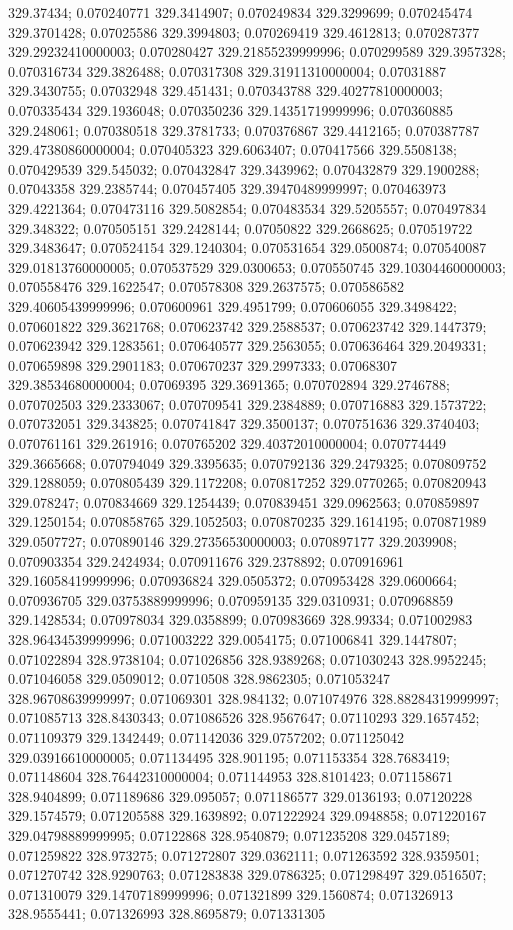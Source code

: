 329.37434; 0.070240771 329.3414907; 0.070249834 329.3299699; 0.070245474 329.3701428; 0.07025586 329.3994803; 0.070269419 329.4612813; 0.070287377 329.29232410000003; 0.070280427 329.21855239999996; 0.070299589 329.3957328; 0.070316734 329.3826488; 0.070317308 329.31911310000004; 0.07031887 329.3430755; 0.07032948 329.451431; 0.070343788 329.40277810000003; 0.070335434 329.1936048; 0.070350236 329.14351719999996; 0.070360885 329.248061; 0.070380518 329.3781733; 0.070376867 329.4412165; 0.070387787 329.47380860000004; 0.070405323 329.6063407; 0.070417566 329.5508138; 0.070429539 329.545032; 0.070432847 329.3439962; 0.070432879 329.1900288; 0.07043358 329.2385744; 0.070457405 329.39470489999997; 0.070463973 329.4221364; 0.070473116 329.5082854; 0.070483534 329.5205557; 0.070497834 329.348322; 0.070505151 329.2428144; 0.07050822 329.2668625; 0.070519722 329.3483647; 0.070524154 329.1240304; 0.070531654 329.0500874; 0.070540087 329.01813760000005; 0.070537529 329.0300653; 0.070550745 329.10304460000003; 0.070558476 329.1622547; 0.070578308 329.2637575; 0.070586582 329.40605439999996; 0.070600961 329.4951799; 0.070606055 329.3498422; 0.070601822 329.3621768; 0.070623742 329.2588537; 0.070623742 329.1447379; 0.070623942 329.1283561; 0.070640577 329.2563055; 0.070636464 329.2049331; 0.070659898 329.2901183; 0.070670237 329.2997333; 0.07068307 329.38534680000004; 0.07069395 329.3691365; 0.070702894 329.2746788; 0.070702503 329.2333067; 0.070709541 329.2384889; 0.070716883 329.1573722; 0.070732051 329.343825; 0.070741847 329.3500137; 0.070751636 329.3740403; 0.070761161 329.261916; 0.070765202 329.40372010000004; 0.070774449 329.3665668; 0.070794049 329.3395635; 0.070792136 329.2479325; 0.070809752 329.1288059; 0.070805439 329.1172208; 0.070817252 329.0770265; 0.070820943 329.078247; 0.070834669 329.1254439; 0.070839451 329.0962563; 0.070859897 329.1250154; 0.070858765 329.1052503; 0.070870235 329.1614195; 0.070871989 329.0507727; 0.070890146 329.27356530000003; 0.070897177 329.2039908; 0.070903354 329.2424934; 0.070911676 329.2378892; 0.070916961 329.16058419999996; 0.070936824 329.0505372; 0.070953428 329.0600664; 0.070936705 329.03753889999996; 0.070959135 329.0310931; 0.070968859 329.1428534; 0.070978034 329.0358899; 0.070983669 328.99334; 0.071002983 328.96434539999996; 0.071003222 329.0054175; 0.071006841 329.1447807; 0.071022894 328.9738104; 0.071026856 328.9389268; 0.071030243 328.9952245; 0.071046058 329.0509012; 0.0710508 328.9862305; 0.071053247 328.96708639999997; 0.071069301 328.984132; 0.071074976 328.88284319999997; 0.071085713 328.8430343; 0.071086526 328.9567647; 0.07110293 329.1657452; 0.071109379 329.1342449; 0.071142036 329.0757202; 0.071125042 329.03916610000005; 0.071134495 328.901195; 0.071153354 328.7683419; 0.071148604 328.76442310000004; 0.071144953 328.8101423; 0.071158671 328.9404899; 0.071189686 329.095057; 0.071186577 329.0136193; 0.07120228 329.1574579; 0.071205588 329.1639892; 0.071222924 329.0948858; 0.071220167 329.04798889999995; 0.07122868 328.9540879; 0.071235208 329.0457189; 0.071259822 328.973275; 0.071272807 329.0362111; 0.071263592 328.9359501; 0.071270742 328.9290763; 0.071283838 329.0786325; 0.071298497 329.0516507; 0.071310079 329.14707189999996; 0.071321899 329.1560874; 0.071326913 328.9555441; 0.071326993 328.8695879; 0.071331305 